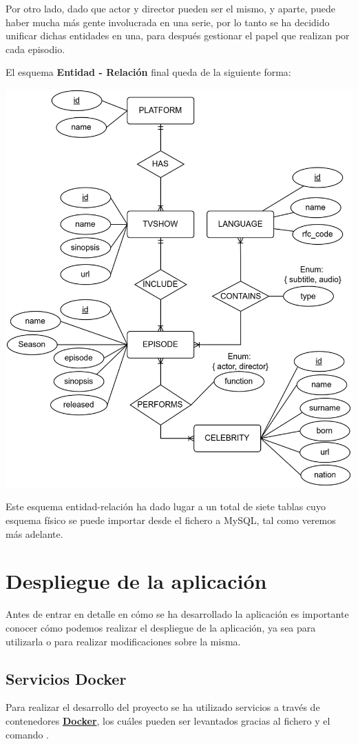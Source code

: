 \documentclass{\ClassPath/viu-tfm-template}
\begin{document}
Por otro lado, dado que actor y director pueden ser el mismo, y aparte, puede haber mucha más gente involucrada en una serie, por lo tanto se ha decidido unificar dichas entidades en una, para después gestionar el papel que realizan por cada episodio.

El esquema \textbf{Entidad - Relación} final queda de la siguiente forma:

\begin{center}
    \includegraphics[width=0.8\linewidth]{img/entidad-relacion.png}
\end{center}


Este esquema entidad-relación ha dado lugar a un total de siete tablas cuyo esquema físico se puede importar desde el fichero  a MySQL, tal como veremos más adelante.

\chapter{Despliegue de la aplicación}
Antes de entrar en detalle en cómo se ha desarrollado la aplicación es importante conocer cómo podemos realizar el despliegue de la aplicación, ya sea para utilizarla o para realizar modificaciones sobre la misma.

\section{Servicios Docker}
Para realizar el desarrollo del proyecto se ha utilizado servicios a través de contenedores \textbf{\href{https://www.docker.com/}{Docker}}, los cuáles pueden ser levantados gracias al fichero  y el comando 
.
\end{document}
